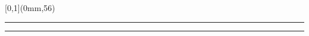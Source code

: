 


\begingroup
{}
\textblockorigin{0mm}{0mm}
\setlength{\parindent}{0mm}
\setlength{\imageheight}{54.9191919\TPVertModule}
\setlength{\logoheight}{4\TPVertModule}
\setlength{\bandeorwidth}{3.203125\logoheight}
\setlength{\banderougewidth}{\paperwidth}
\addtolength{\banderougewidth}{-\bandeorwidth}
\setlength{\bandeorheight}{\TPVertModule}
\setlength{\banderougeheight}{\TPVertModule}
\setlength{\textwidth}{\paperwidth}
\addtolength{\textwidth}{-1.5\TPHorizModule}


\def\titlefmt{\protect\raggedright%
  \sffamily\bfseries
  \fontsize{48}{48}\selectfont
  Rédaction avec
  \rmfamily\mdseries
  \raisebox{10pt}{{\textbackslash}title}%
  \fontsize{80}{70}\selectfont%
  \{%
  \fontsize{70}{70}\selectfont%
  \LaTeX
  \fontsize{80}{70}\selectfont%
  \}}
\def\authorfmt{%
  \sffamily\bfseries\fontsize{28}{38}\selectfont\theauthor}
\def\affiliation{%
  \sffamily\mdseries\fontsize{16}{20}\selectfont
  Professeur titulaire \\
  École d'actuariat, Université Laval}
\def\edition{%
  \sffamily\mdseries\fontsize{16}{16}\selectfont
  Édition {\fullcaps\year}.\month}

\begin{textblock*}{\paperwidth}[0,1](0mm,56\TPVertModule)
  \textcolor{rouge}{\rule{\banderougewidth}{\banderougeheight}}%
  \textcolor{or}{\rule{\bandeorwidth}{\bandeorheight}}           %
\end{textblock*}

